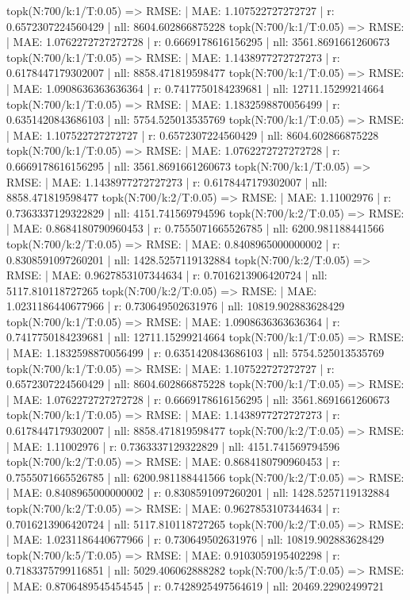 topk(N:700/k:1/T:0.05) => RMSE: | MAE: 1.107522727272727 | r: 0.6572307224560429 | nll: 8604.602866875228
topk(N:700/k:1/T:0.05) => RMSE: | MAE: 1.0762272727272728 | r: 0.6669178616156295 | nll: 3561.8691661260673
topk(N:700/k:1/T:0.05) => RMSE: | MAE: 1.1438977272727273 | r: 0.6178447179302007 | nll: 8858.471819598477
topk(N:700/k:1/T:0.05) => RMSE: | MAE: 1.0908636363636364 | r: 0.7417750184239681 | nll: 12711.15299214664
topk(N:700/k:1/T:0.05) => RMSE: | MAE: 1.1832598870056499 | r: 0.6351420843686103 | nll: 5754.525013535769
topk(N:700/k:1/T:0.05) => RMSE: | MAE: 1.107522727272727 | r: 0.6572307224560429 | nll: 8604.602866875228
topk(N:700/k:1/T:0.05) => RMSE: | MAE: 1.0762272727272728 | r: 0.6669178616156295 | nll: 3561.8691661260673
topk(N:700/k:1/T:0.05) => RMSE: | MAE: 1.1438977272727273 | r: 0.6178447179302007 | nll: 8858.471819598477
topk(N:700/k:2/T:0.05) => RMSE: | MAE: 1.11002976 | r: 0.7363337129322829 | nll: 4151.741569794596
topk(N:700/k:2/T:0.05) => RMSE: | MAE: 0.8684180790960453 | r: 0.7555071665526785 | nll: 6200.981188441566
topk(N:700/k:2/T:0.05) => RMSE: | MAE: 0.8408965000000002 | r: 0.8308591097260201 | nll: 1428.5257119132884
topk(N:700/k:2/T:0.05) => RMSE: | MAE: 0.9627853107344634 | r: 0.7016213906420724 | nll: 5117.810118727265
topk(N:700/k:2/T:0.05) => RMSE: | MAE: 1.0231186440677966 | r: 0.730649502631976 | nll: 10819.902883628429
topk(N:700/k:1/T:0.05) => RMSE: | MAE: 1.0908636363636364 | r: 0.7417750184239681 | nll: 12711.15299214664
topk(N:700/k:1/T:0.05) => RMSE: | MAE: 1.1832598870056499 | r: 0.6351420843686103 | nll: 5754.525013535769
topk(N:700/k:1/T:0.05) => RMSE: | MAE: 1.107522727272727 | r: 0.6572307224560429 | nll: 8604.602866875228
topk(N:700/k:1/T:0.05) => RMSE: | MAE: 1.0762272727272728 | r: 0.6669178616156295 | nll: 3561.8691661260673
topk(N:700/k:1/T:0.05) => RMSE: | MAE: 1.1438977272727273 | r: 0.6178447179302007 | nll: 8858.471819598477
topk(N:700/k:2/T:0.05) => RMSE: | MAE: 1.11002976 | r: 0.7363337129322829 | nll: 4151.741569794596
topk(N:700/k:2/T:0.05) => RMSE: | MAE: 0.8684180790960453 | r: 0.7555071665526785 | nll: 6200.981188441566
topk(N:700/k:2/T:0.05) => RMSE: | MAE: 0.8408965000000002 | r: 0.8308591097260201 | nll: 1428.5257119132884
topk(N:700/k:2/T:0.05) => RMSE: | MAE: 0.9627853107344634 | r: 0.7016213906420724 | nll: 5117.810118727265
topk(N:700/k:2/T:0.05) => RMSE: | MAE: 1.0231186440677966 | r: 0.730649502631976 | nll: 10819.902883628429
topk(N:700/k:5/T:0.05) => RMSE: | MAE: 0.9103059195402298 | r: 0.7183375799116851 | nll: 5029.406062888282
topk(N:700/k:5/T:0.05) => RMSE: | MAE: 0.8706489545454545 | r: 0.7428925497564619 | nll: 20469.22902499721
